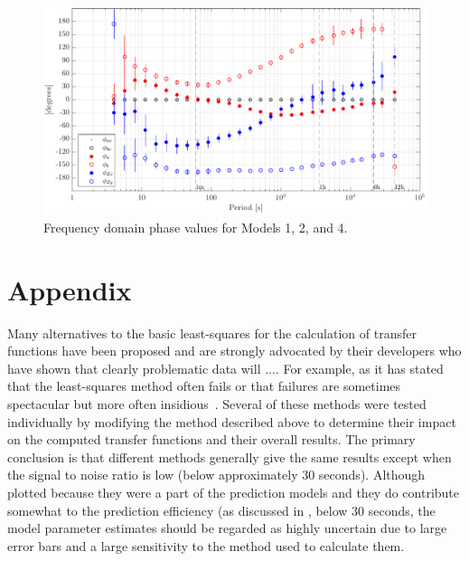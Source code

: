 \documentclass[draft,linenumbers]{agujournal2018}
\begin{document}
\begin{figure}[h]
\centering
\includegraphics[width=\textwidth]{figures/plot_TF_aves_Phi-options-1.pdf}
\caption{Frequency domain phase values for Models 1, 2, and 4.}
\label{Phi}
\end{figure}

\clearpage

\appendix
\section{Appendix}

Many alternatives to the basic least-squares for the calculation of transfer functions have been proposed and are strongly advocated by their developers who have shown that clearly problematic data will .... For example, as it has stated that the least-squares method often fails \citep{Egbert2011} or that failures are sometimes spectacular but more often insidious~\citep{Chave1987}. Several of these methods were tested individually by modifying the method described above to determine their impact on the computed transfer functions and their overall results. The primary conclusion is that different methods generally give the same results except when the signal to noise ratio is low (below approximately $30$ seconds). Although plotted because they were a part of the prediction models and they do contribute somewhat to the prediction efficiency (as discussed in \cite{Weigel2017}, below $30$ seconds, the model parameter estimates should be regarded as highly uncertain due to large error bars and a large sensitivity to the method used to calculate them.
\end{document}
